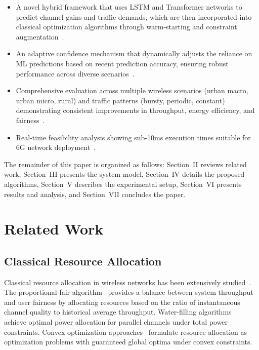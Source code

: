 \documentclass[conference]{IEEEtran}
\begin{document}
\begin{itemize}
    \item A novel hybrid framework that uses LSTM and Transformer networks to predict channel gains and traffic demands, which are then incorporated into classical optimization algorithms through warm-starting and constraint augmentation~\cite{warm_start_optimization}.
    \item An adaptive confidence mechanism that dynamically adjusts the reliance on ML predictions based on recent prediction accuracy, ensuring robust performance across diverse scenarios~\cite{adaptive_algorithms,robust_ml}.
    \item Comprehensive evaluation across multiple wireless scenarios (urban macro, urban micro, rural) and traffic patterns (bursty, periodic, constant) demonstrating consistent improvements in throughput, energy efficiency, and fairness~\cite{qos_wireless}.
    \item Real-time feasibility analysis showing sub-10ms execution times suitable for 6G network deployment~\cite{realtime_systems}.
\end{itemize}

The remainder of this paper is organized as follows: Section~II reviews related work, Section~III presents the system model, Section~IV details the proposed algorithms, Section~V describes the experimental setup, Section~VI presents results and analysis, and Section~VII concludes the paper.

\section{Related Work}

\subsection{Classical Resource Allocation}

Classical resource allocation in wireless networks has been extensively studied~\cite{tse_fundamentals,qos_wireless}. The proportional fair algorithm~\cite{pf_algorithm} provides a balance between system throughput and user fairness by allocating resources based on the ratio of instantaneous channel quality to historical average throughput. Water-filling algorithms~\cite{waterfilling} achieve optimal power allocation for parallel channels under total power constraints. Convex optimization approaches~\cite{boyd_convex,optimization_wireless} formulate resource allocation as optimization problems with guaranteed global optima under convex constraints.
\end{document}
